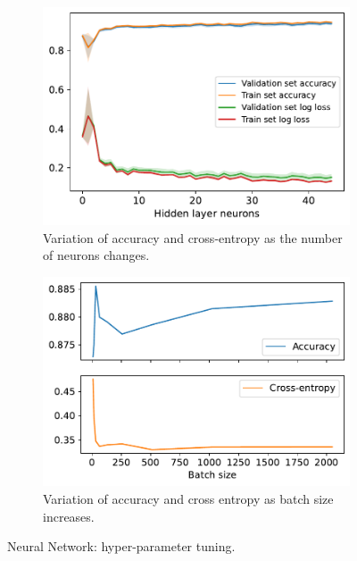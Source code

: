 \documentclass[10pt, a4paper, twocolumn]{article}
\begin{document}
\begin{figure}
\centering
    \begin{subfigure}[t]{0.47\columnwidth}
    \includegraphics[width=\linewidth]{immagini simone/hidden_neurons_acc_loss.pdf}
    \caption{Variation of accuracy and cross-entropy as the number of neurons changes.}
    \label{fig:nn_hidden_neurons}
\end{subfigure}
\hfill%
\begin{subfigure}[t]{0.49\columnwidth}
    \centering
    \includegraphics[width=\linewidth]{immagini simone/batch_size.pdf}
    \caption{Variation of accuracy and cross entropy as batch size increases.}
    \label{fig:nn_batch_size}
    \end{subfigure}
\caption{Neural Network: hyper-parameter tuning.}
\end{figure}
\end{document}
